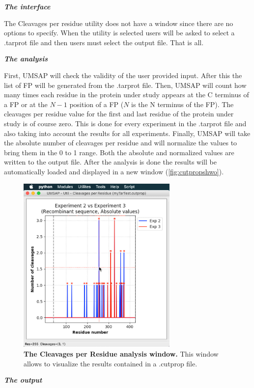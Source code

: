 \textit{\textbf{The interface}}

The Cleavages per residue utility does not have a window since there are no options to specify. When the utility is selected users will be asked to select a .tarprot file and then users must select the output file. That is all.

\textit{\textbf{The analysis}}

First, UMSAP will check the validity of the user provided input. After this the list of FP will be generated from the .tarprot file. Then, UMSAP will count how many times each residue in the protein under study appears at the C terminus of a FP or at the \(N-1\) position of a FP (\(N\) is the N terminus of the FP). The cleavages per residue value for the first and last residue of the protein under study is of course zero. This is done for every experiment in the .tarprot file and also taking into account the results for all experiments. Finally, UMSAP will take the absolute number of cleavages per residue and will normalize the values to bring them in the 0 to 1 range. Both the absolute and normalized values are written to the output file. After the analysis is done the results will be automatically loaded and displayed in a new window (\autoref{fig:cutpropshwo}). 

\begin{figure}[h]
	\centering
	\includegraphics[width=0.7\textwidth]{./IMAGES/UTIL-CUTPROP-WINDOW/util-cutprop-res.jpg}	    
	\caption[The Cleavages per Residue analysis window]{\textbf{The Cleavages per Residue analysis window.} This window allows to visualize the results contained in a .cutprop file.} 
	\label{fig:cutpropshwo}
	\vspace{-5pt} 	
\end{figure}
\newpage
\textit{\textbf{The output}}

